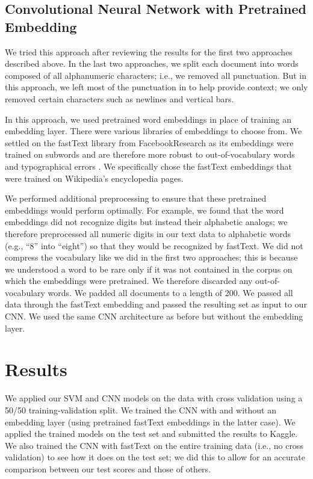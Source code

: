 \documentclass[12pt]{article}
\begin{document}
\subsection{Convolutional Neural Network with Pretrained Embedding}

We tried this approach after reviewing the results for the first two approaches described above. In the last two approaches, we split each document into words composed of all alphanumeric characters; i.e., we removed all punctuation. But in this approach, we left most of the punctuation in to help provide context; we only removed certain characters such as newlines and vertical bars.

In this approach, we used pretrained word embeddings in place of training an embedding layer. There were various libraries of embeddings to choose from. We settled on the fastText library from FacebookResearch as its embeddings were trained on subwords and are therefore more robust to out-of-vocabulary words and typographical errors \cite{fasttext}. We specifically chose the fastText embeddings that were trained on Wikipedia's encyclopedia pages.

We performed additional preprocessing to ensure that these pretrained embeddings would perform optimally. For example, we found that the word embeddings did not recognize digits but instead their alphabetic analogs; we therefore preprocessed all numeric digits in our text data to alphabetic words (e.g., ``8'' into ``eight'') so that they would be recognized by fastText. We did not compress the vocabulary like we did in the first two approaches; this is because we understood a word to be rare only if it was not contained in the corpus on which the embeddings were pretrained. We therefore discarded any out-of-vocabulary words. We padded all documents to a length of 200. We passed all data through the fastText embedding and passed the resulting set as input to our CNN. We used the same CNN architecture as before but without the embedding layer.


\section{Results}

We applied our SVM and CNN models on the data with cross validation using a 50/50 training-validation split. We trained the CNN with and without an embedding layer (using pretrained fastText embeddings in the latter case). We applied the trained models on the test set and submitted the results to Kaggle. We also trained the CNN with fastText on the entire training data (i.e., no cross validation) to see how it does on the test set; we did this to allow for an accurate comparison between our test scores and those of others.
\end{document}

